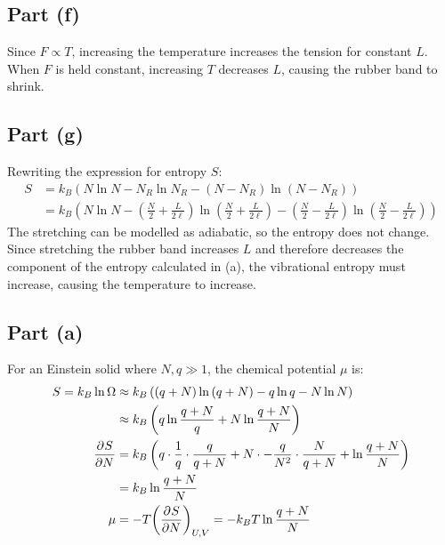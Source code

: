 \documentclass{article}
\begin{document}
\subsection*{Part (f)}
Since $F \propto T$, increasing the temperature increases the tension for constant $L$. When $F$ is held constant, increasing $T$ decreases $L$, causing the rubber band to shrink.
\subsection*{Part (g)}
Rewriting the expression for entropy $S$:
\begin{equation}
    \begin{split}
        S & = k_B\left(N\ln N - N_R\ln N_R - \left(N - N_R\right)\ln\left(N - N_R\right)\right) \\
        & = k_B\left(N\ln N - \left(\frac{N}{2} + \frac{L}{2\ell}\right)\ln\left(\frac{N}{2} + \frac{L}{2\ell}\right) - \left(\frac{N}{2} - \frac{L}{2\ell}\right)\ln\left(\frac{N}{2} - \frac{L}{2\ell}\right)\right)
    \end{split}
\end{equation}
The stretching can be modelled as adiabatic, so the entropy does not change. Since stretching the rubber band increases $L$ and therefore decreases the component of the entropy calculated in (a), the vibrational entropy must increase, causing the temperature to increase.

\clearpage

\subsection*{Part (a)}
For an Einstein solid where $N, q \gg 1$, the chemical potential $\mu$ is:
\begin{equation}
    \begin{split}
        S = k_B\ln\Omega & \approx k_B\left(\left(q + N\right)\ln\left(q + N\right) - q\ln q - N\ln N\right) \\
        & \approx k_B\left(q\ln\frac{q + N}{q} + N\ln\frac{q + N}{N}\right) \\
        \frac{\partial^{}S} {\partial N^{}} & = k_B\left(q \cdot \frac{1}{q} \cdot \frac{q}{q + N} + N \cdot -\frac{q}{N^2} \cdot \frac{N}{q + N} + \ln\frac{q + N}{N}\right) \\
        & = k_B\ln\frac{q + N}{N} \\
        \mu & = -T{\left(\frac{\partial^{}S} {\partial N^{}}\right)}_{U,V} = -k_B T\ln\frac{q + N}{N}
    \end{split}
\end{equation}
\end{document}
